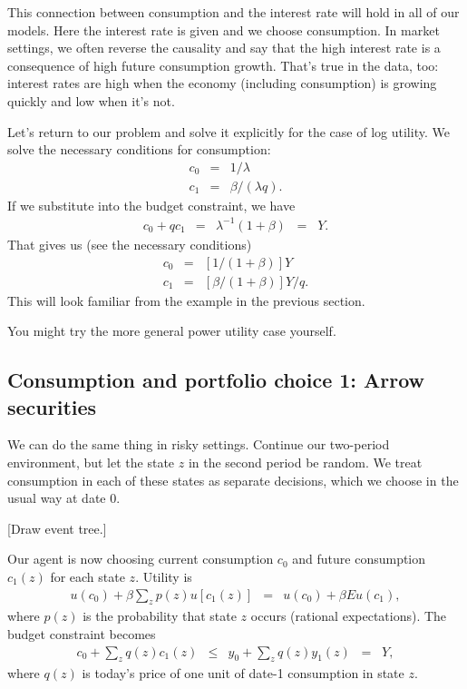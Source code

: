 \documentclass[11pt]{article}
\begin{document}
This connection between consumption and the interest rate
will hold in all of our models.
Here the interest rate is given and we choose consumption.
In market settings, we often reverse the causality
and say that the high interest rate is a consequence
of high future consumption growth.
That's true in the data, too:  interest rates are high
when the economy (including consumption) is growing quickly
and low when it's not.



Let's return to our problem and solve it explicitly
for the case of log utility.
We solve the necessary conditions for consumption:
\begin{eqnarray*}
        c_0  &=& 1/\lambda  \\
        c_1  &=& \beta/(\lambda q) .
\end{eqnarray*}
If we substitute into the budget constraint,
we have
\begin{eqnarray}
    c_0 + q c_1 &=& \lambda^{-1}
            \left(1 + \beta \right) \;\;=\;\; Y.
\end{eqnarray}
That gives us (see the necessary conditions)
\begin{eqnarray*}
        c_0  &=& [1/(1+\beta)] Y \\
        c_1  &=& [\beta/(1+\beta)] Y / q  .
\end{eqnarray*}
This will look familiar from the example in the previous section.

You might try the more general power utility case yourself.


\subsection*{Consumption and portfolio choice 1:  Arrow securities}

We can do the same thing in risky settings.
Continue our two-period environment,
but let the state $z$ in the second period be random.
We treat consumption in each of these states
as separate decisions, which we choose in the usual way
at date 0.

[Draw event tree.]

Our agent is now choosing current consumption $c_0$
and future consumption $c_1(z)$ for each state $z$.
Utility is
\begin{eqnarray}
    u(c_0) + \beta \sum_z p(z) u[c_1(z)]
    &=&     u(c_0) + \beta E u(c_1) ,
    \label{eq:utility-2period-stochastic}
\end{eqnarray}
where $p(z)$ is the probability that state $z$ occurs
(rational expectations).
The budget constraint becomes
\begin{eqnarray}
    c_0 + \sum_z q(z) c_1(z) &\leq& y_0 + \sum_z q(z) y_1(z) \;\;=\;\; Y ,
    \label{eq:budget-2period-stochastic}
\end{eqnarray}
where $q(z)$ is today's price of one unit of date-1 consumption in state $z$.
\end{document}
